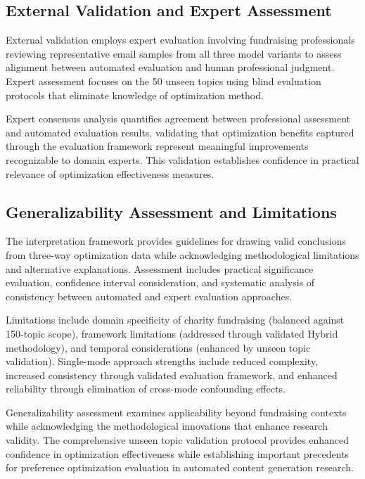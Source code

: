 \subsection{External Validation and Expert Assessment}

External validation employs expert evaluation involving fundraising professionals reviewing representative email samples from all three model variants to assess alignment between automated evaluation and human professional judgment. Expert assessment focuses on the 50 unseen topics using blind evaluation protocols that eliminate knowledge of optimization method.

Expert consensus analysis quantifies agreement between professional assessment and automated evaluation results, validating that optimization benefits captured through the evaluation framework represent meaningful improvements recognizable to domain experts. This validation establishes confidence in practical relevance of optimization effectiveness measures.

\subsection{Generalizability Assessment and Limitations}

The interpretation framework provides guidelines for drawing valid conclusions from three-way optimization data while acknowledging methodological limitations and alternative explanations. Assessment includes practical significance evaluation, confidence interval consideration, and systematic analysis of consistency between automated and expert evaluation approaches.

Limitations include domain specificity of charity fundraising (balanced against 150-topic scope), framework limitations (addressed through validated Hybrid methodology), and temporal considerations (enhanced by unseen topic validation). Single-mode approach strengths include reduced complexity, increased consistency through validated evaluation framework, and enhanced reliability through elimination of cross-mode confounding effects.

Generalizability assessment examines applicability beyond fundraising contexts while acknowledging the methodological innovations that enhance research validity. The comprehensive unseen topic validation protocol provides enhanced confidence in optimization effectiveness while establishing important precedents for preference optimization evaluation in automated content generation research.

